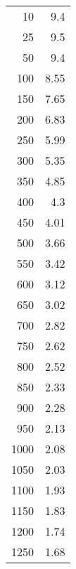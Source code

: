 \begin{tabular}{rr}
\hline
   10 & 9.4  \\
   25 & 9.5  \\
   50 & 9.4  \\
  100 & 8.55 \\
  150 & 7.65 \\
  200 & 6.83 \\
  250 & 5.99 \\
  300 & 5.35 \\
  350 & 4.85 \\
  400 & 4.3  \\
  450 & 4.01 \\
  500 & 3.66 \\
  550 & 3.42 \\
  600 & 3.12 \\
  650 & 3.02 \\
  700 & 2.82 \\
  750 & 2.62 \\
  800 & 2.52 \\
  850 & 2.33 \\
  900 & 2.28 \\
  950 & 2.13 \\
 1000 & 2.08 \\
 1050 & 2.03 \\
 1100 & 1.93 \\
 1150 & 1.83 \\
 1200 & 1.74 \\
 1250 & 1.68 \\
\hline
\end{tabular}
